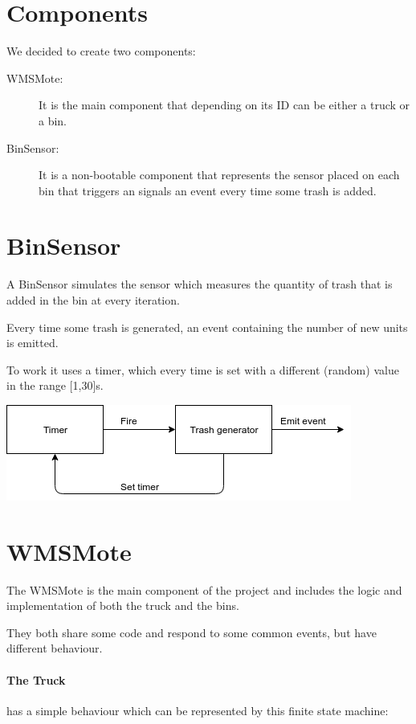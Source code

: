 \documentclass[a4paper,12pt,notitlepage]{report}
\begin{document}
\section*{Components}
We decided to create two components:
\begin{description}
    \item[WMSMote:] It is the main component that depending on its ID can be either a truck or a bin.
    \item[BinSensor:] It is a non-bootable component that represents the sensor placed on each bin that triggers an signals an event every time some trash is added. 
\end{description}

\section*{BinSensor}
A BinSensor simulates the sensor which measures the quantity of trash that is added in the bin at every iteration.

Every time some trash is generated, an event containing the number of new units is emitted.

To work it uses a timer, which every time is set with a different (random) value in the range [1,30]s.\\[1em]
\begin{center}
    \includegraphics[scale=0.9]{sensor.png}
\end{center}

\section*{WMSMote}
The WMSMote is the main component of the project and includes the logic and implementation of both the truck and the bins.

They both share some code and respond to some common events, but have different behaviour.

\paragraph{The Truck}
has a simple behaviour which can be represented by this finite state machine:
\end{document}

